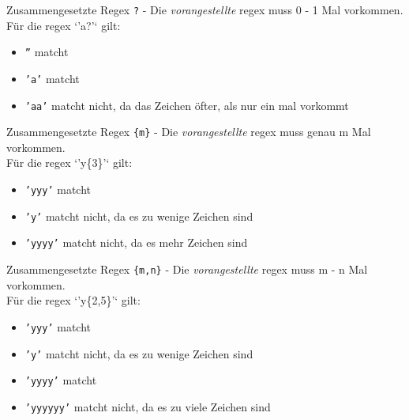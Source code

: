 \begin{frame}{Zusammengesetzte Regex}
	\texttt{?} - Die \textit{vorangestellte} regex muss 0 - 1 Mal vorkommen.\\[.25cm]
	Für die regex `'a?'` gilt:\\
	\begin{itemize}
		\item \texttt{''} matcht
		\item \texttt{'a'} matcht
		\item \texttt{'aa'} matcht nicht, da das Zeichen öfter, als nur ein mal vorkommt
	\end{itemize}
\end{frame}

\begin{frame}{Zusammengesetzte Regex}
	\texttt{\{m\}} - Die \textit{vorangestellte} regex muss genau m Mal vorkommen.\\[.25cm]
	Für die regex `'y\{3\}'` gilt:\\
	\begin{itemize}
		\item \texttt{'yyy'} matcht
		\item \texttt{'y'} matcht nicht, da es zu wenige Zeichen sind
		\item \texttt{'yyyy'} matcht nicht, da es mehr Zeichen sind
	\end{itemize}
\end{frame}

\begin{frame}{Zusammengesetzte Regex}
	\texttt{\{m,n\}} -  Die \textit{vorangestellte} regex muss m - n Mal vorkommen.\\[.25cm]
	Für die regex `'y\{2,5\}'` gilt:\\
	\begin{itemize}
		\item \texttt{'yyy'} matcht
		\item \texttt{'y'} matcht nicht, da es zu wenige Zeichen sind
		\item \texttt{'yyyy'} matcht
		\item \texttt{'yyyyyy'} matcht nicht, da es zu viele Zeichen sind
	\end{itemize}
\end{frame}

